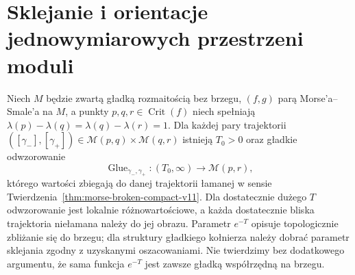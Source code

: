 \section{Sklejanie i orientacje jednowymiarowych przestrzeni moduli}
\begin{twierdzenie}
\label{thm:morse-gluing-v11}
Niech $M$ będzie zwartą gładką rozmaitością bez brzegu,
$(f,g)$ parą Morse'a--Smale'a na $M$, a punkty
$p,q,r\in\operatorname{Crit}(f)$ niech spełniają
$\lambda(p)-\lambda(q)=\lambda(q)-\lambda(r)=1$.
Dla każdej pary trajektorii
$([\gamma_-],[\gamma_+])\in
\mathcal M(p,q)\times\mathcal M(q,r)$
istnieją $T_0>0$ oraz gładkie odwzorowanie
\[
\operatorname{Glue}_{\gamma_-,\gamma_+}:
(T_0,\infty)\longrightarrow\mathcal M(p,r),
\]
którego wartości zbiegają do danej trajektorii łamanej
w sensie Twierdzenia~\ref{thm:morse-broken-compact-v11}.
Dla dostatecznie dużego $T$ odwzorowanie jest lokalnie różnowartościowe,
a każda dostatecznie bliska trajektoria niełamana należy do
jej obrazu. Parametr $e^{-T}$ opisuje topologicznie zbliżanie się do
brzegu; dla struktury gładkiego kołnierza należy dobrać
parametr sklejania zgodny z uzyskanymi oszacowaniami.
Nie twierdzimy bez dodatkowego argumentu, że sama funkcja
$e^{-T}$ jest zawsze gładką współrzędną na brzegu.
\end{twierdzenie}
